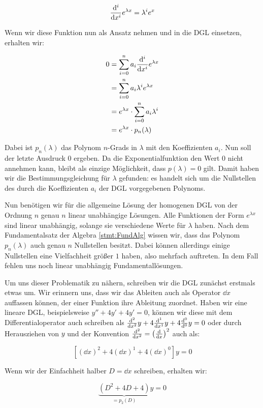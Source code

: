 $$
    \frac{\mathrm{d}^{i}{}}{\mathrm{d}{x^{i}}} e^{\lambda x} = \lambda^i e^x
$$

Wenn wir diese Funktion nun als Ansatz nehmen und in die DGL einsetzen, erhalten wir:

\begin{alignat*}{1}
    0 &= \sum\limits_{i=0}^n a_i \frac{\mathrm{d}^{i}{}}{\mathrm{d}{x^{i}}} e^{\lambda x} \\
      &= \sum\limits_{i=0}^n a_i \lambda^i e^{\lambda x} \\
      &= e^{\lambda x} \cdot \sum\limits_{i=0}^n a_i \lambda^i \\
      &= e^{\lambda x} \cdot p_n(\lambda)
\end{alignat*}

Dabei ist $p_n(\lambda)$ das Polynom $n$-Grads in $\lambda$ mit den Koeffizienten $a_i$. Nun soll der letzte Ausdruck $0$ ergeben. Da die Exponentialfunktion den Wert $0$ nicht annehmen kann, bleibt als einzige Möglichkeit, dass $p(\lambda) = 0$ gilt. Damit haben wir die Bestimmungsgleichung für $\lambda$ gefunden: es handelt sich um die Nullstellen des durch die Koeffizienten $a_i$ der DGL vorgegebenen Polynoms.

Nun benötigen wir für die allgemeine Lösung der homogenen DGL von der Ordnung $n$ genau $n$ linear unabhängige Lösungen. Alle Funktionen der Form $e^{\lambda x}$ sind linear unabhängig, solange sie verschiedene Werte für $\lambda$ haben. Nach dem Fundamentalsatz der Algebra \ref{stmt:FundAlg} wissen wir, dass das Polynom $p_n(\lambda)$ auch genau $n$ Nullstellen besitzt. Dabei können allerdings einige Nullstellen eine Vielfachheit größer $1$ haben, also mehrfach auftreten. In dem Fall fehlen uns noch linear unabhängig Fundamentallösungen.

Um uns dieser Problematik zu nähern, schreiben wir die DGL zunächst erstmals etwas um. Wir erinnern uns, dass wir das Ableiten auch als Operator $\dd{}{x}$ auffassen können, der einer Funktion ihre Ableitung zuordnet. Haben wir eine lineare DGL, beispielsweise $y''+4y'+4y'=0$, können wir diese mit dem Differentialoperator auch schreiben als $\frac{\mathrm{d}^{2}{}}{\mathrm{d}{x^{2}}} y + 4\frac{\mathrm{d}^{1}{}}{\mathrm{d}{x^{1}}} y + 4\frac{\mathrm{d}^{0}{}}{\mathrm{d}{^{0}}} y = 0$ oder durch Herausziehen von $y$ und der Konvention $\frac{\mathrm{d}^{2}{}}{\mathrm{d}{x^{2}}} = \left(\frac{\mathrm{d}{}}{\mathrm{d}{x}}\right)^2$ auch als:

$$
    \left[ \left(\dd{}{x}\right)^2 + 4 \left(\dd{}{x}\right)^1 + 4 \left(\dd{}{x}\right)^0 \right] y = 0
$$

Wenn wir der Einfachheit halber $D=\dd{}{x}$  schreiben, erhalten wir:

$$
    \underbrace{(D^2+4D+4)}_{=p_2(D)} y = 0
$$

